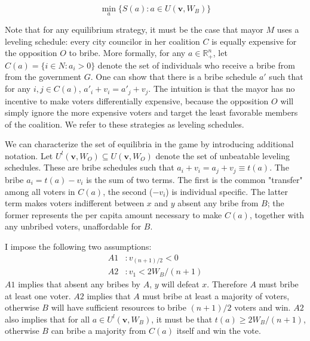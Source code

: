 \documentclass[12pt,a4paper]{article}
\begin{document}
\begin{equation}
    \label{eqn:solution}
    \min_a\{S(a) : a \in U(\mathbf{v}, W_B) \}
\end{equation}

Note that for any equilibrium strategy, it must be the case that mayor $M$ uses a leveling schedule: every city councilor in her coalition $C$ is equally expensive for the opposition $O$ to bribe. More formally, for any $a \in \mathbb{R}_+^n$, let $C(a) = \{i \in N : a_i > 0\}$ denote the set of individuals who receive a bribe from from the government $G$. One can show that there is a bribe schedule $a'$ such that for any $i,j \in C(a)$, $a'_i + v_i = a'_j + v_j$. The intuition is that the mayor has no incentive to make voters differentially expensive, because the opposition $O$ will simply ignore the more expensive voters and target the least favorable members of the coalition. We refer to these strategies as leveling schedules.

We can characterize the set of equilibria in the game by introducing additional notation. Let $U^l(\mathbf{v}, W_O) \subseteq U(\mathbf{v}, W_O)$ denote the set of unbeatable leveling schedules. These are bribe schedules such that $a_i + v_i = a_j + v_j  \equiv t(a)$. The bribe $a_i = t(a) - v_i$ is the sum of two terms. The first is the common "transfer" among all voters in $C(a)$, the second ($-v_i$) is individual specific. The latter term makes voters indifferent between $x$ and $y$ absent any bribe from $B$; the former represents the per capita amount necessary to make $C(a)$, together with any unbribed voters, unaffordable for $B$.

I impose the following two assumptions:
\begin{align*}
    A1 &: v_{(n+1)/2} < 0\\
    A2 &: v_1 < 2W_B/(n+1) 
\end{align*}
$A1$ implies that absent any bribes by $A$, $y$ will defeat $x$. Therefore $A$ must bribe at least one voter. $A2$ implies that $A$ must bribe at least a majority of voters, otherwise $B$ will have sufficient resources to bribe $(n+1)/2$ voters and win. $A2$ also implies that for all $a \in U^l(\mathbf{v}, W_B)$, it must be that $t(a) \geq 2W_B/(n + 1)$, otherwise $B$ can bribe a majority from $C(a)$ itself and win the vote.
\end{document}

